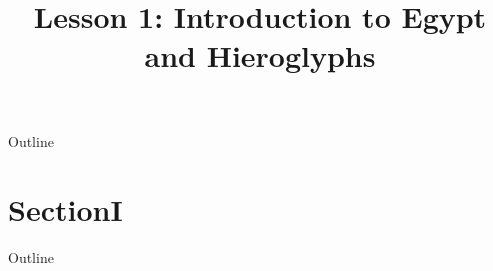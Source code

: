 \documentclass[english,svgnames,notes=hide,aspectratio=169,14pt]{beamer}
\title{Lesson 1: Introduction to Egypt and Hieroglyphs}
\begin{document}


\begin{frame}[plain]

  \titlepage

\end{frame}



\begin{frame}{Outline}

   \tableofcontents

\end{frame}


\section{SectionI}


\begin{frame}{Outline}

   \tableofcontents[currentsection]

\end{frame}

\end{document}
